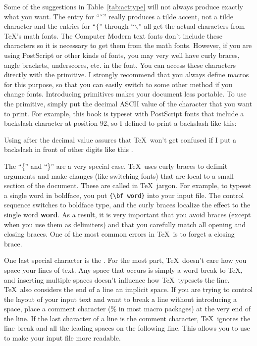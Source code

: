 \begin{sidebar}
Some of the suggestions in Table~\ref{tab:acttype} will not always produce
exactly what you want.  The entry for ``\~{\ }'' really produces a tilde
accent, not a tilde character and the entries for ``$\{$'' through
``$\backslash$'' all get the actual characters from \TeX's math fonts.  The
Computer Modern text fonts don't include these characters so it is necessary
to get them from the math fonts.  However, if you are using PostScript
or other kinds of fonts, you may very well have curly braces, angle brackets,
underscores, etc. in the font.  You can access these characters directly 
with the  primitive.  I strongly recommend that you always
define macros for this purpose, so that you can easily switch to some other
method if you change fonts.  Introducing  primitives makes your
document less portable.  To use the  primitive, simply put
the decimal ASCII value of the character that you want to print.  For example,
this book is typeset with PostScript fonts that include a backslash character
at position 92, so I defined  to print a backslash like this:

\begin{shortexample}
\def\bs{\char92\relax}
\end{shortexample}

Using  after the decimal value assures that \TeX\ won't
get confused if I put a backslash in front of other digits like
this .
\end{sidebar}

The  ``\{'' and ``\}'' are a very special
case.  \TeX\ uses curly braces to delimit arguments and make changes
(like switching fonts) that are local to a small section of the
document.  These are 
called \textit{} in \TeX\
jargon.  For example, to typeset a single word in boldface, you 
put \verb|{\bf word}| into your input file.  The \cs{bf}
control sequence switches to boldface type, and the curly braces
localize the effect to the single word {\bf word}.  As a result, it is
very important that you avoid braces (except when you use them as
delimiters) and that you carefully match all opening and closing
braces.  One of the most common errors in \TeX\ is to forget a closing
brace.

One last special character is the .  For the most part,
\TeX\ doesn't care how you space your lines of text.  Any space that
occurs is simply a word break to \TeX, and inserting multiple spaces
doesn't influence how \TeX\ typesets the line.  \TeX\ also considers
the end of a line an implicit space.  If you are trying to control
the layout of your input text and want to break a line without
introducing a space, place a comment character (\% in most macro
packages)\index{comments!in tex@in \TeX} at the very 
end of the line.  If the last character of a
line is the comment character, \TeX\ ignores the line break and all
the leading spaces on the following line.  This allows you to use
\idx{indentation} to make your input file more readable.
\goodbreak

